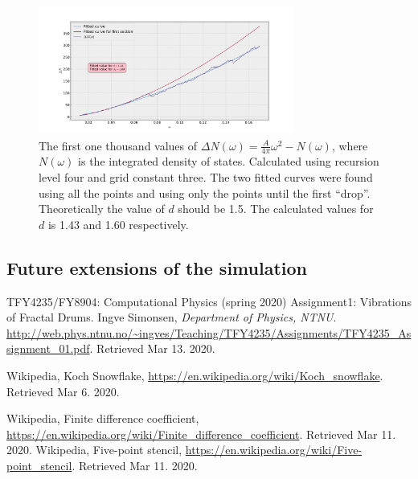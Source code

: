 \documentclass[a4paper, 12pt]{article}
\begin{document}
\begin{figure}[ht]
  \centering
  \includegraphics[width=0.75\textwidth]{media/fractal_dimension_delta_N_values_level_4_grid_constant_3_num_modes_999}
  \caption{The first one thousand values of $\Delta N(\omega) = \frac{A}{4\pi} \omega^2 - N(\omega)$, where $N(\omega)$ is the integrated density of states.
    Calculated using recursion level four and grid constant three.
    The two fitted curves were found using all the points and using only the points until the first ``drop''.
    Theoretically the value of $d$ should be 1.5.
    The calculated values for $d$ is 1.43 and 1.60 respectively.
  \label{fig:fractal_dimension}}
\end{figure}

\subsection{Future extensions of the simulation}

\begin{thebibliography}{9}
 TFY4235/FY8904: Computational Physics (spring 2020) Assignment1: Vibrations of Fractal Drums. Ingve Simonsen, \emph{Department of Physics, NTNU}. \url{http://web.phys.ntnu.no/~ingves/Teaching/TFY4235/Assignments/TFY4235_Assignment_01.pdf}. Retrieved Mar 13. 2020.

 Wikipedia, Koch Snowflake, \url{https://en.wikipedia.org/wiki/Koch_snowflake}. Retrieved Mar 6. 2020.

 Wikipedia, Finite difference coefficient, \url{https://en.wikipedia.org/wiki/Finite_difference_coefficient}. Retrieved Mar 11. 2020.
 Wikipedia, Five-point stencil, \url{https://en.wikipedia.org/wiki/Five-point_stencil}. Retrieved Mar 11. 2020.
\end{thebibliography}
\end{document}
